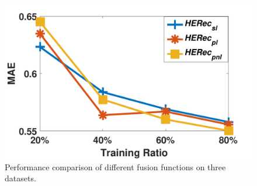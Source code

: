 \begin{figure}
{\begin{minipage}[b]{0.3\textwidth}
\includegraphics[width=1\textwidth]{image/fusion_db_mae.pdf}
\end{minipage}
}
\caption{\label{fig_fusion}Performance comparison of different fusion functions on three datasets.}
\end{figure}

